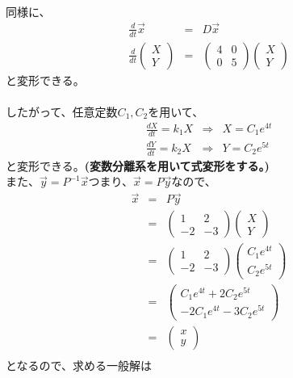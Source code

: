 \documentclass[a4j]{jsarticle}
\begin{document}
\begin{spacing}{1.6}
\begin{qparts}
  同様に、
  \begin{eqnarray*}
    \frac{d}{dt}\overrightarrow x & = & D \overrightarrow x \\
    \frac{d}{dt}
    \left(
    \begin{array}{ccc}
    X \\
    Y
    \end{array}
    \right)
    & = &
    \left(
    \begin{array}{ccc}
    4 & 0 \\
    0 & 5
    \end{array}
    \right)
    \left(
    \begin{array}{ccc}
    X \\
    Y
    \end{array}
    \right)
  \end{eqnarray*}
  と変形できる。\\\\
  したがって、任意定数$C_1, C_2$を用いて、
  \begin{eqnarray*}
    \frac{dX}{dt} = k_1X & \Rightarrow & X  = C_1e ^{4t}\\
    \frac{dY}{dt} = k_2X & \Rightarrow & Y  = C_2e ^{5t}
  \end{eqnarray*}
  と変形できる。{\bf (変数分離系を用いて式変形をする。)}\\
  また、$\overrightarrow y = P^{-1} \overrightarrow x$つまり、$\overrightarrow x = P \overrightarrow y$なので、
  \begin{eqnarray*}
    \overrightarrow x & = & P \overrightarrow y \\
    & = &
    \left(
    \begin{array}{ccc}
    1 & 2 \\
    -2 & -3
    \end{array}
    \right)
    \left(
    \begin{array}{ccc}
    X \\
    Y
    \end{array}
    \right) \\
    & = &
    \left(
    \begin{array}{ccc}
    1 & 2 \\
    -2 & -3
    \end{array}
    \right)
    \left(
    \begin{array}{ccc}
    C_1 e ^ {4t} \\
    C_2 e ^ {5t}
    \end{array}
    \right) \\
    & = &
    \left(
    \begin{array}{ccc}
    C_1 e ^ {4t} + 2 C_2 e ^ {5t} \\
    -2C_1 e ^ {4t} - 3 C_2 e ^ {5t}
    \end{array}
    \right) \\
    & = &
    \left(
    \begin{array}{ccc}
    x \\
    y
    \end{array}
    \right) \\
  \end{eqnarray*}
  となるので、求める一般解は


\end{qparts}
\end{spacing}
\end{document}
